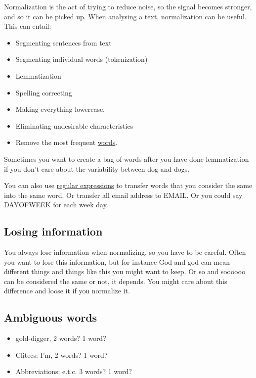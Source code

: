 \documentclass[
  11pt,
  british,
]{article}
\providecommand{\tightlist}{%
  \setlength{\itemsep}{0pt}\setlength{\parskip}{0pt}}
\begin{document}
Normalization is the act of trying to reduce noise, so the signal
becomes stronger, and so it can be picked up. When analysing a text,
normalization can be useful. This can entail:

\begin{itemize}
\tightlist
\item
  Segmenting sentences from text
\item
  Segmenting individual words (tokenization)
\item
  Lemmatization
\item
  Spelling correcting
\item
  Making everything lowercase.
\item
  Eliminating undesirable characteristics
\item
  Remove the most frequent \href{Words.md}{words}.
\end{itemize}

Sometimes you want to create a bag of words after you have done
lemmatization if you don't care about the variability between dog and
dogs.

You can also use \href{../Languages/Regular\%20expression.md}{regular
expressions} to transfer words that you consider the same into the same
word. Or transfer all email address to EMAIL. Or you could say DAYOFWEEK
for each week day.

\hypertarget{losing-information}{%
\subsection{Losing information}\label{losing-information}}

You always lose information when normalizing, so you have to be careful.
Often you want to lose this information, but for instance God and god
can mean different things and things like this you might want to keep.
Or so and soooooo can be considered the same or not, it depends. You
might care about this difference and loose it if you normalize it.

\hypertarget{ambiguous-words}{%
\subsection{Ambiguous words}\label{ambiguous-words}}

\begin{itemize}
\tightlist
\item
  gold-digger, 2 words? 1 word?
\item
  Clitecs: I'm, 2 words? 1 word?
\item
  Abbreviations: e.t.c. 3 words? 1 word?
\end{itemize}
\end{document}
